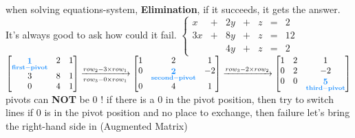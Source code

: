 \documentclass[12pt, a4paper]{article}
\begin{document}
\noindent when solving equations-system, 
\newline
{\bf{Elimination}}, if it succeeds, it gets the answer.
\newline
It's always good to ask how could it fail.
\vspace{14pt}
\newline
\begin{math}
	\left\{  
	\begin{array}{rclrclrcl}
		x & + & 2y & + & z & = & 2 \\
		3x & + & 8y & + & z & = & 12 \\
		& & 4y & + & z & = & 2 
	\end{array}  
	\right.
\end{math}
\vspace{14pt}
\newline
\begin{math}
	\begin{bmatrix}
		{\bf{\textcolor{anhao-sky}{\mathop{1}\limits_{first-pivot}}}} & 2 & 1 \\
		3 & 8 & 1 \\
		0 & 4 & 1
	\end{bmatrix}
	\xrightarrow[row_3 - 0 \times row_1]{row_2 - 3 \times row_1}
	\begin{bmatrix}
		1 & 2 & 1 \\
		0 & {\bf{\textcolor{anhao-sky}{\mathop{2}\limits_{second-pivot}}}} & -2 \\
		0 & 4 & 1
	\end{bmatrix}
	\xrightarrow[]{row_3 - 2 \times row_2}
	\begin{bmatrix}
		1 & 2 & 1 \\
		0 & 2 & -2 \\
		0 & 0 & {\bf{\textcolor{anhao-sky}{\mathop{5}\limits_{third-pivot}}}}
	\end{bmatrix}
\end{math}
\newline
{\textcolor{anhao-scarlet}{pivots can {\bf{NOT}} be 0 !}}
\newline
if there is a 0 in the pivot position, then try to switch lines
\newline
if 0 is in the pivot position and no place to exchange, then failure
\vspace{14pt}
\newline
let's bring the right-hand side in (Augmented Matrix)
\newline
\end{document}
